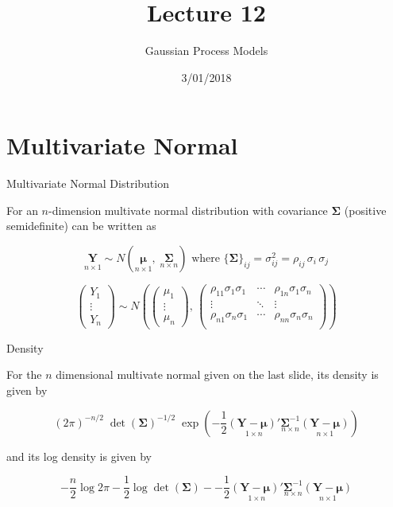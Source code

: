 \documentclass[11pt,ignorenonframetext,]{beamer}
\title{Lecture 12}
\subtitle{Gaussian Process Models}
\date{3/01/2018}
\begin{document}
\frame{\titlepage}

\hypertarget{multivariate-normal}{%
\section{Multivariate Normal}\label{multivariate-normal}}

\begin{frame}[t]{%
\protect\hypertarget{multivariate-normal-distribution}{%
Multivariate Normal Distribution}}

For an \(n\)-dimension multivate normal distribution with covariance
\(\symbf{\Sigma}\) (positive semidefinite) can be written as

\[
\underset{n \times 1}{\symbf{Y}} \sim N(\underset{n \times 1}{\symbf{\mu}}, \; \underset{n \times n}{\symbf{\Sigma}}) \text{   where   } \{\symbf{\Sigma}\}_{ij} = \sigma^2_{ij} = \rho_{ij} \, \sigma_{i} \, \sigma_{j}
\]

\vspace{2mm}

\[
\begin{pmatrix}
Y_1\\ \vdots\\ Y_n
\end{pmatrix}
\sim N\left(
\begin{pmatrix}
\mu_1\\ \vdots\\ \mu_n
\end{pmatrix}, \,
\begin{pmatrix}
\rho_{11}\sigma_1\sigma_1 & \cdots & \rho_{1n}\sigma_1\sigma_n \\
\vdots & \ddots & \vdots \\
\rho_{n1}\sigma_n\sigma_1 & \cdots & \rho_{nn}\sigma_n\sigma_n \\
\end{pmatrix}
\right)
\]

\end{frame}

\begin{frame}[t]{%
\protect\hypertarget{density}{%
Density}}

For the \(n\) dimensional multivate normal given on the last slide, its
density is given by

\[
(2\pi)^{-n/2} \; \det(\symbf{\Sigma})^{-1/2} \; \exp{\left(-\frac{1}{2} \underset{1 \times n}{(\symbf{Y}-\symbf{\mu})'} \underset{n \times n}{\symbf{\Sigma}^{-1}} \underset{n \times 1}{(\symbf{Y}-\symbf{\mu})}\right)} 
\]

and its log density is given by

\[
-\frac{n}{2} \log 2\pi - \frac{1}{2} \log \det(\symbf{\Sigma}) - -\frac{1}{2} \underset{1 \times n}{(\symbf{Y}-\symbf{\mu})'} \underset{n \times n}{\symbf{\Sigma}^{-1}} \underset{n \times 1}{(\symbf{Y}-\symbf{\mu})}
\]

\end{frame}
\end{document}
